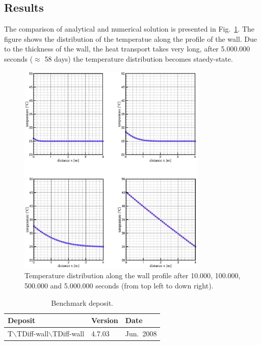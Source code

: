 \subsection{Results}

The comparison of analytical and numerical solution is presented in Fig.~\ref{fig-lhdw-all}. The figure shows the distribution of the temperatue along the profile of the wall. Due to the thickness of the wall, the heat transport takes very long, after 5.000.000 seconds ($\approx$ 58 days) the temperature distribution becomes staedy-state.
\begin{figure}[h]
\centering
\includegraphics[width=0.8\textwidth]{T/figures/lhdw-all.eps}
\caption{Temperature distribution along the wall profile after 10.000, 100.000, 500.000 and 5.000.000 seconds (from top left to down right).}
\label{fig-lhdw-all}
\end{figure}
\begin{table}
\caption{Benchmark deposit.}
\begin{center}
\begin{tabular}{lll}
\toprule
Deposit & Version & Date \\
\midrule
T$\backslash$TDiff-wall$\backslash$TDiff-wall & 4.7.03 & Jun.~2008 \\
\bottomrule
\end{tabular}
\end{center}
\end{table}
